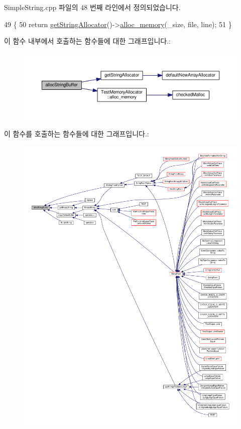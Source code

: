 Simple\+String.\+cpp 파일의 48 번째 라인에서 정의되었습니다.


\begin{DoxyCode}
49 \{
50     \textcolor{keywordflow}{return} \hyperlink{class_simple_string_a26321ad812a6ba4e06b98cf958797b6f}{getStringAllocator}()->\hyperlink{class_test_memory_allocator_a2ebbde51a1d514c74e9e2a09a21b0624}{alloc\_memory}(\_size, file, line);
51 \}
\end{DoxyCode}


이 함수 내부에서 호출하는 함수들에 대한 그래프입니다.\+:
\nopagebreak
\begin{figure}[H]
\begin{center}
\leavevmode
\includegraphics[width=350pt]{class_simple_string_aa9edfa37772bc9395a55082d7d253590_cgraph}
\end{center}
\end{figure}




이 함수를 호출하는 함수들에 대한 그래프입니다.\+:
\nopagebreak
\begin{figure}[H]
\begin{center}
\leavevmode
\includegraphics[width=350pt]{class_simple_string_aa9edfa37772bc9395a55082d7d253590_icgraph}
\end{center}
\end{figure}


